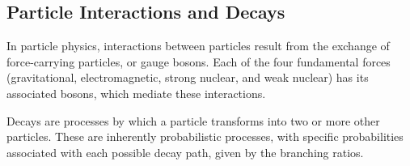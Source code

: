 \subsection{Particle Interactions and Decays}

In particle physics, interactions between particles result from the exchange of force-carrying particles, or gauge
bosons. Each of the four fundamental forces (gravitational, electromagnetic, strong nuclear, and weak nuclear) has its
associated bosons, which mediate these interactions.

Decays are processes by which a particle transforms into two or more other particles. These are inherently probabilistic
processes, with specific probabilities associated with each possible decay path, given by the branching ratios.